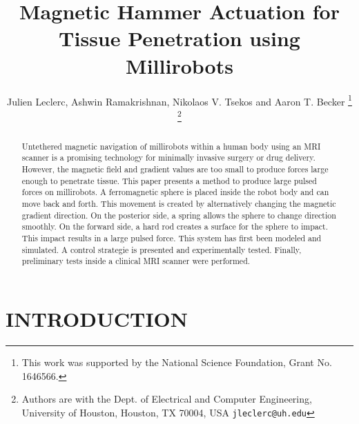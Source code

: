 \documentclass[letterpaper, 10 pt, conference]{ieeeconf}  %
\title{\LARGE \bf
Magnetic Hammer Actuation for Tissue Penetration using Millirobots
}
\author{Julien Leclerc, Ashwin Ramakrishnan, Nikolaos V. Tsekos and Aaron T. Becker %
\thanks{This work was supported by the National Science Foundation, Grant No. 1646566. }%
\thanks{Authors are with the Dept. of Electrical and Computer
Engineering, University of Houston, Houston, TX 70004, USA
        {\tt\small jleclerc@uh.edu}}%
}
\begin{document}
\maketitle
\thispagestyle{empty}
\pagestyle{empty}


\begin{abstract}

Untethered magnetic navigation of millirobots within a human body using an MRI scanner is a promising technology for minimally invasive surgery or drug delivery. However, the magnetic field and gradient values are too small to produce forces large enough to penetrate tissue. This paper presents a method to produce large pulsed forces on millirobots. A ferromagnetic sphere is placed inside the robot body and can move back and forth. This movement is created by alternatively changing the magnetic gradient direction. On the posterior side, a spring allows the sphere to change direction smoothly. On the forward side, a hard rod creates a surface for the sphere to impact. This impact results in a large pulsed force. This system has first been modeled and simulated. A control strategie is presented and experimentally tested. Finally, preliminary tests inside a clinical MRI scanner were performed. 

\end{abstract}


\section{INTRODUCTION}
\end{document}
